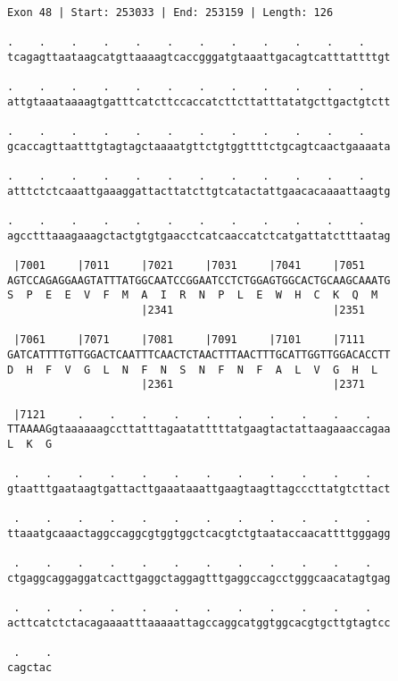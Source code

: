 \documentclass{article}
\begin{document}
\begin{Verbatim}
Exon 48 | Start: 253033 | End: 253159 | Length: 126
 
.    .    .    .    .    .    .    .    .    .    .    .    
tcagagttaataagcatgttaaaagtcaccgggatgtaaattgacagtcatttattttgt
  
.    .    .    .    .    .    .    .    .    .    .    .    
attgtaaataaaagtgatttcatcttccaccatcttcttatttatatgcttgactgtctt
  
.    .    .    .    .    .    .    .    .    .    .    .    
gcaccagttaatttgtagtagctaaaatgttctgtggttttctgcagtcaactgaaaata
  
.    .    .    .    .    .    .    .    .    .    .    .    
atttctctcaaattgaaaggattacttatcttgtcatactattgaacacaaaattaagtg
  
.    .    .    .    .    .    .    .    .    .    .    .    
agcctttaaagaaagctactgtgtgaacctcatcaaccatctcatgattatctttaatag
  
 |7001     |7011     |7021     |7031     |7041     |7051    
AGTCCAGAGGAAGTATTTATGGCAATCCGGAATCCTCTGGAGTGGCACTGCAAGCAAATG
S  P  E  E  V  F  M  A  I  R  N  P  L  E  W  H  C  K  Q  M  
                     |2341                         |2351    
  
 |7061     |7071     |7081     |7091     |7101     |7111    
GATCATTTTGTTGGACTCAATTTCAACTCTAACTTTAACTTTGCATTGGTTGGACACCTT
D  H  F  V  G  L  N  F  N  S  N  F  N  F  A  L  V  G  H  L  
                     |2361                         |2371    
  
 |7121     .    .    .    .    .    .    .    .    .    .   
TTAAAAGgtaaaaaagccttatttagaatatttttatgaagtactattaagaaaccagaa
L  K  G                                                     
  
 .    .    .    .    .    .    .    .    .    .    .    .   
gtaatttgaataagtgattacttgaaataaattgaagtaagttagcccttatgtcttact
  
 .    .    .    .    .    .    .    .    .    .    .    .   
ttaaatgcaaactaggccaggcgtggtggctcacgtctgtaataccaacattttgggagg
  
 .    .    .    .    .    .    .    .    .    .    .    .   
ctgaggcaggaggatcacttgaggctaggagtttgaggccagcctgggcaacatagtgag
  
 .    .    .    .    .    .    .    .    .    .    .    .   
acttcatctctacagaaaatttaaaaattagccaggcatggtggcacgtgcttgtagtcc
  
 .    .
cagctac
\end{Verbatim}
\newpage
\end{document}
